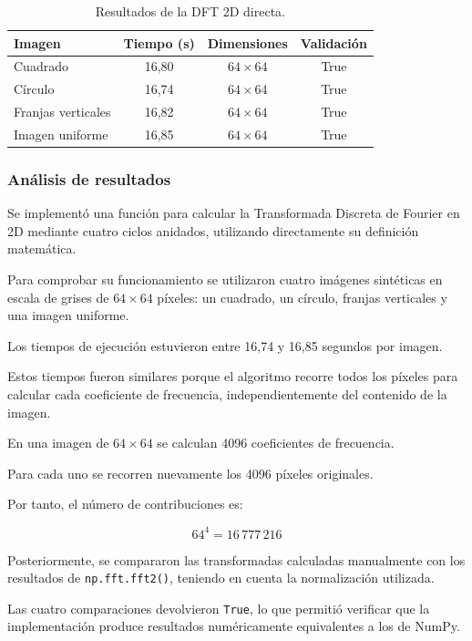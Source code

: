 \documentclass[11pt,letterpaper]{article}
\begin{document}
\begin{table}[H]
\centering
\caption{Resultados de la DFT 2D directa.}
\label{tab:directa}

\begin{tabular}{lccc}
\toprule
\textbf{Imagen} &
\textbf{Tiempo (s)} &
\textbf{Dimensiones} &
\textbf{Validación}\\
\midrule
Cuadrado & 16,80 & $64\times64$ & True\\
Círculo & 16,74 & $64\times64$ & True\\
Franjas verticales & 16,82 & $64\times64$ & True\\
Imagen uniforme & 16,85 & $64\times64$ & True\\
\bottomrule
\end{tabular}

\end{table}

\subsubsection*{Análisis de resultados}

Se implementó una función para calcular
la Transformada Discreta de Fourier en 2D
mediante cuatro ciclos anidados, utilizando
directamente su definición matemática.

Para comprobar su funcionamiento se utilizaron
cuatro imágenes sintéticas en escala de grises
de $64\times64$ píxeles: un cuadrado, un círculo,
franjas verticales y una imagen uniforme.

Los tiempos de ejecución estuvieron entre
16,74 y 16,85 segundos por imagen.

Estos tiempos fueron similares porque
el algoritmo recorre todos los píxeles
para calcular cada coeficiente de frecuencia,
independientemente del contenido de la imagen.

En una imagen de $64\times64$ se calculan
4096 coeficientes de frecuencia.

Para cada uno se recorren nuevamente
los 4096 píxeles originales.

Por tanto, el número de contribuciones es:

\[
64^4=16\,777\,216
\]

Posteriormente, se compararon las transformadas
calculadas manualmente con los resultados de
\texttt{np.fft.fft2()}, teniendo en cuenta
la normalización utilizada.

Las cuatro comparaciones devolvieron
\texttt{True}, lo que permitió verificar
que la implementación produce resultados
numéricamente equivalentes a los de NumPy.
\end{document}
